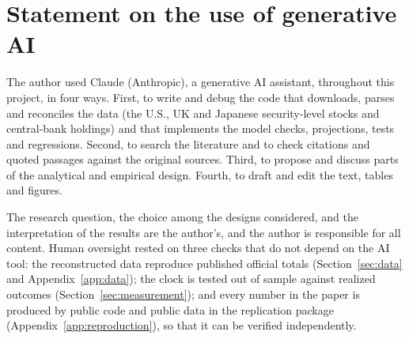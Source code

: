 \section*{Statement on the use of generative AI}

The author used Claude (Anthropic), a generative AI assistant, throughout this project, in four ways. First, to write and debug the code that downloads, parses and reconciles the data (the U.S., UK and Japanese security-level stocks and central-bank holdings) and that implements the model checks, projections, tests and regressions. Second, to search the literature and to check citations and quoted passages against the original sources. Third, to propose and discuss parts of the analytical and empirical design. Fourth, to draft and edit the text, tables and figures.

The research question, the choice among the designs considered, and the interpretation of the results are the author's, and the author is responsible for all content. Human oversight rested on three checks that do not depend on the AI tool: the reconstructed data reproduce published official totals (Section~\ref{sec:data} and Appendix~\ref{app:data}); the clock is tested out of sample against realized outcomes (Section~\ref{sec:measurement}); and every number in the paper is produced by public code and public data in the replication package (Appendix~\ref{app:reproduction}), so that it can be verified independently.
